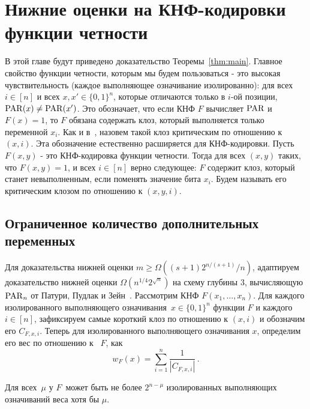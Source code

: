 \section{Нижние оценки на КНФ-кодировки функции четности}
В этой главе будут приведено доказательство Теоремы~\ref{thm:main}.
Главное свойство функции четности, которым мы будем пользоваться - это высокая чувствительность 
(каждое выполняющее означивание изолированно):
для всех $i \in [n]$ и всех $x,x' \in \{0,1\}^n$, которые отличаются только в $i$-ой позиции,
$\operatorname{PAR}(x) \neq \operatorname{PAR}(x')$.
Это обозначает, что если КНФ $F$ вычисляет $\operatorname{PAR}$ и $F(x) = 1$, то $F$ обязана содержать клоз, 
который выполняется только переменной $x_i$.
Как и в~\cite{DBLP:journals/cjtcs/PaturiPZ99}, назовем такой клоз критическим по отношению к $(x,i)$.
Эта обозначение естественно расширяется для КНФ-кодировки. Пусть $F(x, y)$ - это КНФ-кодировка функции четности.
Тогда для всех $(x, y)$ таких, что $F(x, y) = 1$, и всех $i \in [n]$ верно следующее: $F$ содержит клоз,
который станет невыполненным, если поменять значение бита $x_i$. 
Будем называть его критическим клозом по отношению к $(x, y, i)$.
\subsection{Ограниченное количество дополнительных переменных}
Для доказательства нижней оценки $m \ge \Omega((s+1)2^{n/(s+1)}/n)$, адаптируем доказательство нижней оценки $\Omega(n^{1/4}2^{\sqrt n})$ на схему глубины $3$, вычисляющую $\operatorname{PAR}_n$ 
от Патури, Пудлак и Зейн~\cite{DBLP:journals/cjtcs/PaturiPZ99}. 
Рассмотрим КНФ $F(x_1, \dotsc, x_n)$.
Для каждого изолированного выполняющего означивания~$x \in \{0,1\}^n$ функции $F$ и каждого~$i \in [n]$, зафиксируем самые короткий клоз по отношению к $(x,i)$ и обозначим его $C_{F,x,i}$.
Теперь для изолированного выполняющего означивания $x$, определим его вес по отношению к ~$F$, как 
\[w_F(x) = \sum\limits_{i=1}^n \frac{1}{|C_{F,x,i}|} \, .\]

\begin{lemma}\label{lemma:isolatedweight}
	Для всех~$\mu$ у $F$~может быть не более $2^{n - \mu}$ изолированных выполняющих означиваний 
	веса хотя бы $\mu$.
\end{lemma}

